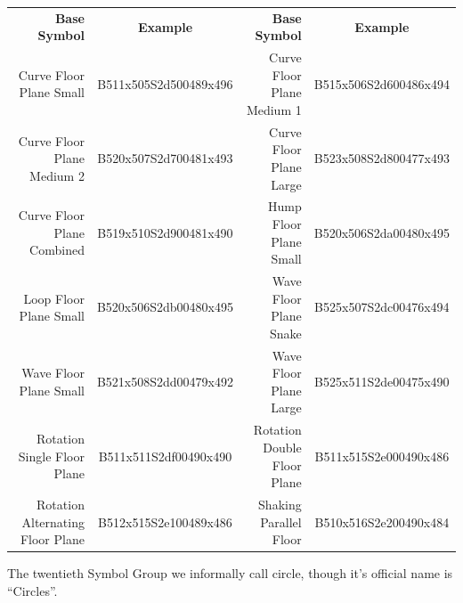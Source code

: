 \documentclass{article}
\begin{document}
\begin{center}
\begin{tabular}{rcrc}
\textbf{Base Symbol}&\textbf{Example}&\textbf{Base Symbol}&\textbf{Example}\\
Curve Floor Plane Small         &B511x505S2d500489x496&Curve Floor Plane Medium 1 &B515x506S2d600486x494\\
Curve Floor Plane Medium 2      &B520x507S2d700481x493&Curve Floor Plane Large    &B523x508S2d800477x493\\
Curve Floor Plane Combined      &B519x510S2d900481x490&Hump Floor Plane Small     &B520x506S2da00480x495\\
Loop Floor Plane Small          &B520x506S2db00480x495&Wave Floor Plane Snake     &B525x507S2dc00476x494\\
Wave Floor Plane Small          &B521x508S2dd00479x492&Wave Floor Plane Large     &B525x511S2de00475x490\\
Rotation Single Floor Plane     &B511x511S2df00490x490&Rotation Double Floor Plane&B511x515S2e000490x486\\
Rotation Alternating Floor Plane&B512x515S2e100489x486&Shaking Parallel Floor     &B510x516S2e200490x484\\
\end{tabular}
\end{center}

The twentieth Symbol Group we informally call circle, though it's official name is ``Circles''.
\end{document}
